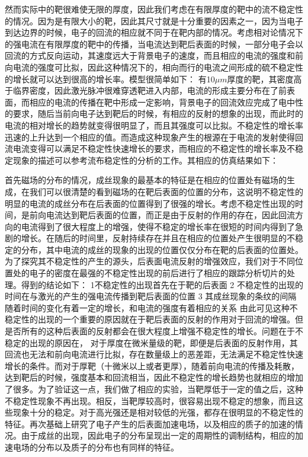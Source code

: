 然而实际中的靶很难使无限的厚度，因此我们考虑在有限厚度的靶中的流不稳定性的情况。因为是有限大小的靶，因此其尺寸就是十分重要的因素之一，因为当电子到达边界的时候，电子的回流的相应就不同于在靶内部的情况。考虑相对论情况下的强电流在有限厚度的靶中的传播，当电流达到靶后表面的时候，一部分电子会以回流的方式反向运动，其速度远大于背景电子的速度，而且相应的电流的强度和前向电流的强度可比拟，因此这种情况下的，相向而行的电流之间形成的硫不稳定性的增长就可以达到很高的增长率。模型很简单如下： 有10$\mu m$厚度的靶，其密度高于临界密度，因此激光脉冲很难穿透靶进入内部，电流的形成主要分布在了前表面，而相应的电流的传播在靶中形成一定影响，背景电子的回流效应完成了电中性的要求，随后当前向电子达到靶后的时候，有相应的反射的想象的出现，而此时的电流的相对增长的趋势就变得很明显了，而且其强度可以比拟。不稳定性的增长率迅速的上升达到一个相应的值。而造成这种现象产生的根源在于电流的发射使得回流电流变得可以满足不稳定性快速增长的要求，而相应的不稳定性的增长率及不稳定现象的描述可以参考流布稳定性的分析的工作。其相应的仿真结果如下：

首先磁场的分布的情况，成丝现象的最基本的特征是在相应的位置处有磁场的生成，在我们可以很清楚的看到磁场的在靶后表面的位置的分布，这说明不稳定性的明显的电流的成丝分布在后表面的位置得到了很强的增长。考虑不稳定性出现的时间，是前向电流达到靶后表面的位置，而正是由于反射的作用的存在，因此回流方向的电流得到了很大程度上的增强，使得不稳定的增长率在很短的时间内得到了急剧的增长。在随后的时间里，反射持续存在并且在相应的位置处产生很明显的不稳定的分布，其中电流的成丝的现象的出现的位置仅仅分布在靶的后表面的位置处。为了探究其不稳定性的产生的源头，后表面电流反射的增强效应，我们对于不同位置处的电子的密度在最强的不稳定性出现的前后进行了相应的跟踪分析切片的处理。得到的结论如下：
1不稳定性的出现首先在于靶的后表面
2 不稳定性的出现的时间在与激光的产生的强电流传播到靶后表面的位置
3 其成丝现象的条纹的间隔随着时间的变化有着一定的增长，和电流的强度有着相应的关系
由此可见这种不稳定性的出现的一个重要的原因就在于靶后表面的反射的作用对于回流的增强。但是否所有的这种后表面的反射都会在很大程度上增强不稳定性的增长。问题在于不稳定的出现的原因在， 对于厚度在微米量级的靶，即便是后表面的反射作用，其回流也无法和前向电流进行比拟，存在数量级上的恶差距，无法满足不稳定性快速增长的条件。而对于厚靶（十微米以上或者更厚），随着前向电流的传播及耗散，达到靶后的时候，强度基本和回流相当，因此不稳定性的增长趋势也就相应的增加了很多。为了验证这一点，我们做了相应的实验，当靶厚低于一定的值之后，这种不稳定性现象不再出现。相反，当靶厚较高时，很容易出现不稳定的想象，而且这些现象十分的稳定。对于高光强还是相对较低的光强，都存在很明显的不稳定性的特征。再次基础上研究了电子产生的后表面加速电场，以及相应的质子的加速的情况。由于成丝的出现，因此电子的分布呈现出一定的周期性的调制结构，相应的加速电场的分布以及质子的分布也有同样的特征。





